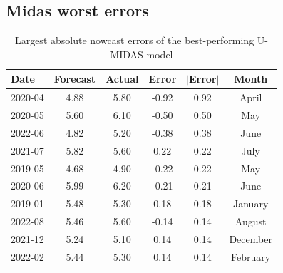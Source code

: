 \documentclass[12pt,a4paper]{article}
\begin{document}
\subsection{Midas worst errors}
\begin{table}[H]
\centering
\caption{Largest absolute nowcast errors of the best-performing U-MIDAS model}
\label{tab:midas_worst_errors}
\begin{tabular}{lccccc}
\hline
Date & Forecast & Actual & Error & $|$Error$|$ & Month \\
\hline
2020-04 & 4.88 & 5.80 & -0.92 & 0.92 & April \\
2020-05 & 5.60 & 6.10 & -0.50 & 0.50 & May \\
2022-06 & 4.82 & 5.20 & -0.38 & 0.38 & June \\
2021-07 & 5.82 & 5.60 & 0.22 & 0.22 & July \\
2019-05 & 4.68 & 4.90 & -0.22 & 0.22 & May \\
2020-06 & 5.99 & 6.20 & -0.21 & 0.21 & June \\
2019-01 & 5.48 & 5.30 & 0.18 & 0.18 & January \\
2022-08 & 5.46 & 5.60 & -0.14 & 0.14 & August \\
2021-12 & 5.24 & 5.10 & 0.14 & 0.14 & December \\
2022-02 & 5.44 & 5.30 & 0.14 & 0.14 & February \\
\hline
\end{tabular}
\end{table}






\newpage
\end{document}
